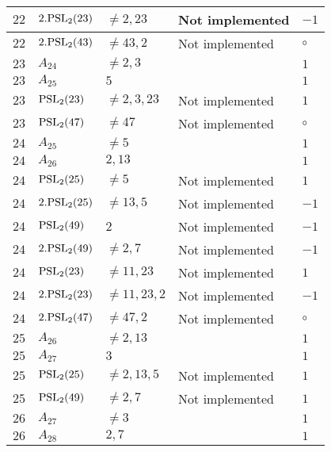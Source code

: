 \documentclass[a4paper, 11pt]{article}
\begin{document}
\begin{longtable}{lllll}
        $ 22 $ & $ 2.{\rm PSL}_{2}(23) $ & $ \neq 2, 23 $ & Not implemented & $ -1  $ \\ \hline
        $ 22 $ & $ 2.{\rm PSL}_{2}(43) $ & $ \neq 43, 2 $ & Not implemented & $\circ$ \\ \hline
        $ 23 $ & $ A_{24} $ & $ \neq 2, 3 $ & $ ~ $ & $ 1  $ \\ \hline
        $ 23 $ & $ A_{25} $ & $ 5 $ & $ ~ $ & $ 1  $ \\ \hline
        $ 23 $ & $ {\rm PSL}_{2}(23) $ & $ \neq 2, 3, 23 $ & Not implemented & $ 1  $ \\ \hline
        $ 23 $ & $ {\rm PSL}_{2}(47) $ & $ \neq 47 $ & Not implemented & $\circ$ \\ \hline
        $ 24 $ & $ A_{25} $ & $ \neq 5 $ & $ ~ $ & $ 1  $ \\ \hline
        $ 24 $ & $ A_{26} $ & $ 2, 13 $ & $ ~ $ & $ 1  $ \\ \hline
        $ 24 $ & $ {\rm PSL}_{2}(25) $ & $ \neq 5 $ & Not implemented & $ 1  $ \\ \hline
        $ 24 $ & $ 2.{\rm PSL}_{2}(25) $ & $ \neq 13, 5 $ & Not implemented & $ -1  $ \\ \hline
        $ 24 $ & $ {\rm PSL}_{2}(49) $ & $ 2 $ & Not implemented & $ -1  $ \\ \hline
        $ 24 $ & $ 2.{\rm PSL}_{2}(49) $ & $ \neq 2, 7 $ & Not implemented & $ -1  $ \\ \hline
        $ 24 $ & $ {\rm PSL}_{2}(23) $ & $ \neq 11, 23 $ & Not implemented & $ 1  $ \\ \hline
        $ 24 $ & $ 2.{\rm PSL}_{2}(23) $ & $ \neq 11, 23, 2 $ & Not implemented & $ -1  $ \\ \hline
        $ 24 $ & $ 2.{\rm PSL}_{2}(47) $ & $ \neq 47, 2 $ & Not implemented & $\circ$ \\ \hline
        $ 25 $ & $ A_{26} $ & $ \neq 2, 13 $ & $ ~ $ & $ 1  $ \\ \hline
        $ 25 $ & $ A_{27} $ & $ 3 $ & $ ~ $ & $ 1  $ \\ \hline
        $ 25 $ & $ {\rm PSL}_{2}(25) $ & $ \neq 2, 13, 5 $ & Not implemented & $ 1  $ \\ \hline
        $ 25 $ & $ {\rm PSL}_{2}(49) $ & $ \neq 2, 7 $ & Not implemented & $ 1  $ \\ \hline
        $ 26 $ & $ A_{27} $ & $ \neq 3 $ & $ ~ $ & $ 1  $ \\ \hline
        $ 26 $ & $ A_{28} $ & $ 2, 7 $ & $ ~ $ & $ 1  $ \\ \hline

\end{longtable}
\end{document}

